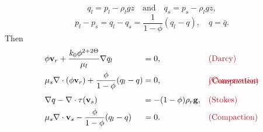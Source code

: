 \documentclass[usenames,dvipsnames,letterpaper,landscape,final]{slides}
\theoremstyle{definition}
\begin{document}
\begin{myslide}
\begin{equation*}
	q_l = p_l - \rho_l g z\quad\text{and}\quad q_s = p_s - \rho_l g z,
\end{equation*}
\begin{equation*}
		  p_l - p_s = q_l - q_s = \frac{1}{1-\phi}(q_l - q), \quad q=\bar{q}.
\end{equation*}
Then
		  \begin{equation*}
\begin{alignedat}{3}
		  &\phi\mathbf{v}_r + \frac{k_0\phi^{2+2\Theta}}{\mu_l}\nabla q_l &&= 0, \qquad \vspace*{0.5cm} && \Maroon{(\text{Darcy})}\\
		  &\mu_s\nabla \cdot (\phi\mathbf{v}_r) + \frac{\phi}{1-\phi}(q_l-q) &&=0,
&&\Maroon{(\text{Conservation}}\\[-20pt]
& && &&\Maroon{\text{/Compaction})}\\[8pt]
  		  &\nabla q - \nabla \cdot \tau(\mathbf{v}_s) &&= -(1-\phi)\rho_r\mathbf{g}, \quad && \Maroon{(\text{Stokes})}\\
		  &\mu_s\nabla \cdot \mathbf{v}_s - \frac{\phi}{1-\phi}(q_l-q) &&=0. &&\Maroon{(\text{Compaction})}
\end{alignedat}
		  \end{equation*}

\end{myslide}
\end{document}
